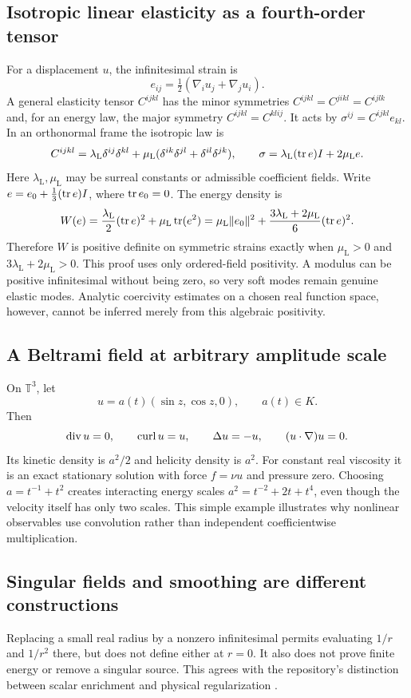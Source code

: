 \documentclass[11pt,letterpaper]{article}
\theoremstyle{definition}
\theoremstyle{remark}
\newcommand{\curl}{\operatorname{curl}}
\begin{document}
\subsection{Isotropic linear elasticity as a fourth-order tensor}
For a displacement $u$, the infinitesimal strain is
\[
 e_{ij}=\tfrac12(\nabla_i u_j+\nabla_j u_i).
\]
A general elasticity tensor $C^{ijkl}$ has the minor symmetries
$C^{ijkl}=C^{jikl}=C^{ijlk}$ and, for an energy law, the major symmetry
$C^{ijkl}=C^{klij}$. It acts by $\sigma^{ij}=C^{ijkl}e_{kl}$.
In an orthonormal frame the isotropic law is
\[
 C^{ijkl}=\lambda_{\mathrm L}\delta^{ij}\delta^{kl}
 +\mu_{\mathrm L}(\delta^{ik}\delta^{jl}+\delta^{il}\delta^{jk}),
 \qquad \sigma=\lambda_{\mathrm L}(\operatorname{tr} e)I+2\mu_{\mathrm L} e.
\]
Here $\lambda_{\mathrm L},\mu_{\mathrm L}$ may be surreal constants or admissible coefficient fields. Write $e=e_0+\frac13(\operatorname{tr} e)I$, where $\operatorname{tr} e_0=0$. The energy density is
\begin{equation}\label{vtf:3d:eq:elastic}
 W(e)=\frac{\lambda_{\mathrm L}}2(\operatorname{tr} e)^2+\mu_{\mathrm L}\operatorname{tr}(e^2)
 =\mu_{\mathrm L}\lVert e_0\rVert^2+\frac{3\lambda_{\mathrm L}+2\mu_{\mathrm L}}{6}(\operatorname{tr} e)^2.
\end{equation}
Therefore $W$ is positive definite on symmetric strains exactly when
$\mu_{\mathrm L}>0$ and $3\lambda_{\mathrm L}+2\mu_{\mathrm L}>0$. This proof uses only ordered-field positivity. A modulus can be positive infinitesimal without being zero, so very soft modes remain genuine elastic modes. Analytic coercivity estimates on a chosen real function space, however, cannot be inferred merely from this algebraic positivity.

\subsection{A Beltrami field at arbitrary amplitude scale}
On $\mathbb T^3$, let
\[
 u=a(t)(\sin z,\cos z,0),\qquad a(t)\in K.
\]
Then
\[
 \Div u=0,\qquad \curl u=u,\qquad \Delta u=-u,
 \qquad (u\cdot\nabla)u=0.
\]
Its kinetic density is $a^2/2$ and helicity density is $a^2$. For constant real viscosity it is an exact stationary solution with force $f=\nu u$ and pressure zero. Choosing $a=t^{-1}+t^2$ creates interacting energy scales
$a^2=t^{-2}+2t+t^4$, even though the velocity itself has only two scales. This simple example illustrates why nonlinear observables use convolution rather than independent coefficientwise multiplication.

\subsection{Singular fields and smoothing are different constructions}
Replacing a small real radius by a nonzero infinitesimal permits evaluating $1/r$ and $1/r^2$ there, but does not define either at $r=0$. It also does not prove finite energy or remove a singular source. This agrees with the repository's distinction between scalar enrichment and physical regularization \cite{RepoPhysics}.
\end{document}
